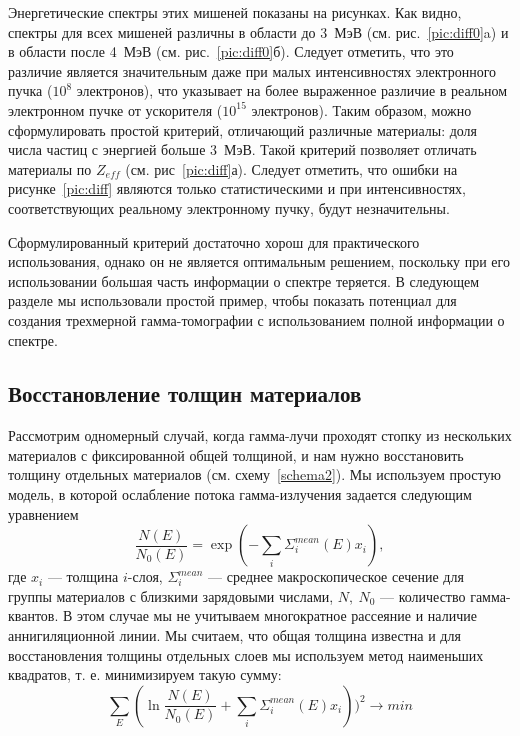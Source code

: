 Энергетические спектры этих мишеней показаны на рисунках. Как видно, спектры для всех мишеней различны в области до 3~МэВ (см. рис.~\ref{pic:diff0}a) и в области после 4~МэВ (см. рис.~\ref{pic:diff0}б). Следует отметить, что это различие является значительным даже при малых интенсивностях электронного пучка ($10^8$ электронов), что указывает на более выраженное различие в реальном электронном пучке от ускорителя ($10^{15}$ электронов). Таким образом, можно сформулировать простой критерий, отличающий различные материалы: доля числа частиц с энергией больше 3~МэВ. Такой критерий позволяет отличать материалы по $Z_{eff}$ (см. рис~\ref{pic:diff}а). Следует отметить, что ошибки на рисунке~\ref{pic:diff} являются только статистическими и при интенсивностях, соответствующих реальному электронному пучку, будут незначительны.

Сформулированный критерий достаточно хорош для практического использования, однако он не является оптимальным решением, поскольку при его использовании большая часть информации о спектре теряется. В следующем разделе мы использовали простой пример, чтобы показать потенциал для создания трехмерной гамма-томографии с использованием полной информации о спектре.

\subsection{Восстановление толщин материалов}
Рассмотрим одномерный случай, когда гамма-лучи проходят стопку из нескольких материалов с фиксированной общей толщиной, и нам нужно восстановить толщину отдельных материалов (см. схему~\ref{schema2}). Мы используем простую модель, в которой ослабление потока гамма-излучения задается следующим уравнением
\begin{equation}
\label{eq:gamma}
\frac{N(E)}{N_0(E)} = \exp(-\sum_i \Sigma^{mean}_i(E)x_i),
\end{equation}
где $x_i$ --- толщина $i$-слоя, $\Sigma^{mean}_i$ --- среднее макроскопическое сечение для группы материалов с близкими зарядовыми числами, $N,~N_0$ --- количество гамма-квантов. В этом случае мы не учитываем многократное рассеяние и наличие аннигиляционной линии. Мы считаем, что общая толщина известна и для восстановления толщины отдельных слоев мы используем метод наименьших квадратов, т. е. минимизируем такую сумму:
\begin{equation}
\sum_E(\ln \frac{N(E)}{N_0(E)} + \sum_i \Sigma^{mean}_i(E)x_i))^2 \to min
\end{equation}

